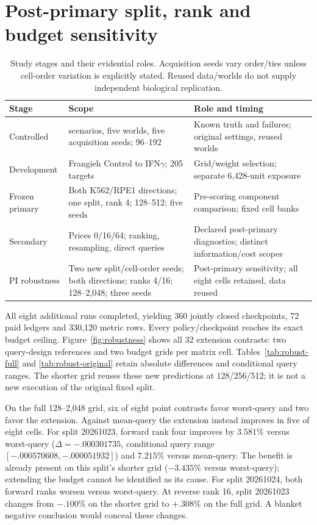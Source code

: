 \section{Post-primary split, rank and budget sensitivity}
\label{sec:robustness}
\begin{table}[htbp]
\centering\small
\caption{Study stages and their evidential roles. Acquisition seeds vary order/ties unless cell-order variation is explicitly stated. Reused data/worlds do not supply independent biological replication.}
\label{tab:study}
\begin{tabular}{>{\raggedright\arraybackslash}p{.19\linewidth}>{\raggedright\arraybackslash}p{.35\linewidth}>{\raggedright\arraybackslash}p{.36\linewidth}}
\toprule
Stage & Scope & Role and timing\\
\midrule
Controlled & 14 scenarios, five worlds, five acquisition seeds; 96--192 & Known truth and failures; original settings, reused worlds\\
Development & Frangieh Control to IFN$\gamma$; 205 targets & Grid/weight selection; separate 6,428-unit exposure\\
Frozen primary & Both K562/RPE1 directions; one split, rank 4; 128--512; five seeds & Pre-scoring component comparison; fixed cell banks\\
Secondary & Prices 0/16/64; ranking, resampling, direct queries & Declared post-primary diagnostics; distinct information/cost scopes\\
PI robustness & Two new split/cell-order seeds; both directions; ranks 4/16; 128--2,048; three seeds & Post-primary sensitivity; all eight cells retained, data reused\\
\bottomrule
\end{tabular}
\end{table}

All eight additional runs completed, yielding 360 jointly closed checkpoints, 72 paid ledgers and 330,120 metric rows. Every policy/checkpoint reaches its exact budget ceiling. Figure~\ref{fig:robustness} shows all 32 extension contrasts: two query-design references and two budget grids per matrix cell. Tables~\ref{tab:robust-full} and \ref{tab:robust-original} retain absolute differences and conditional query ranges. The shorter grid reuses these new predictions at 128/256/512; it is not a new execution of the original fixed split.

On the full 128--2,048 grid, six of eight point contrasts favor worst-query and two favor the extension. Against mean-query the extension instead improves in five of eight cells. For split 20261023, forward rank four improves by $3.581\%$ versus worst-query ($\Delta=-.000301735$, conditional query range $[-.000570608,-.000051932]$) and $7.215\%$ versus mean-query. The benefit is already present on this split's shorter grid ($-3.435\%$ versus worst-query); extending the budget cannot be identified as its cause. For split 20261024, both forward ranks worsen versus worst-query. At reverse rank 16, split 20261023 changes from $-.100\%$ on the shorter grid to $+.308\%$ on the full grid. A blanket negative conclusion would conceal these changes.

